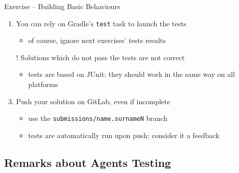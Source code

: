 \documentclass{beamer}\mode<presentation>{\usetheme{AMSCesenaPurpleAndGold}}
\begin{document}
\begin{frame}[c,allowframebreaks]{Exercise \currentExercise{} -- Building Basic Behaviours}
\begin{enumerate}
        \medskip

        \item You can rely on Gradle's \texttt{test} task to launch the tests
        \begin{itemize}
            \item of course, ignore next exercises' tests results
        \end{itemize}

        \medskip

        \item[!] Solutions which do not pass the tests are not correct
        \begin{itemize}
            \item tests are based on JUnit: they should work in the same way on all platforms
        \end{itemize}

        \medskip

        \item Push your solution on GitLab, \alert{even if incomplete}
        \begin{itemize}
            \item use the \texttt{submissions/\alert{name.surnameN}} branch
            \item tests are automatically run upon push: consider it a feedback
        \end{itemize}

    \end{enumerate}

\end{frame}

\subsection{Remarks about Agents Testing}
\end{document}
